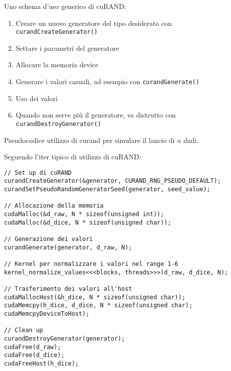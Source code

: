 \begin{questions}
\begin{solution}
        Uno schema d'uso generico di cuRAND:
        \begin{enumerate}
            \item Creare un nuovo generatore del tipo desiderato con \texttt{curandCreateGenerator()}
            
            \item Settare i parametri del generatore 
            
            \item Allocare la memoria device 
            
            \item Generare i valori casuali, ad esempio con \texttt{curandGenerate()}
            
            \item Uso dei valori 
            
            \item Quando non serve più il generatore, va distrutto con \texttt{curandDestroyGenerator()}
        \end{enumerate}
    \end{solution}
    
    \question Pseudocodice utilizzo di curand per simulare il lancio di $n$ dadi.
    
    \begin{solution}
        Seguendo l'iter tipico di utilizzo di cuRAND:
        \begin{verbatim}
// Set up di cuRAND
curandCreateGenerator(&generator, CURAND_RNG_PSEUDO_DEFAULT);
curandSetPseudoRandomGeneratorSeed(generator, seed_value);

// Allocazione della memoria
cudaMalloc(&d_raw, N * sizeof(unsigned int));
cudaMalloc(&d_dice, N * sizeof(unsigned char));

// Generazione dei valori
curandGenerate(generator, d_raw, N);

// Kernel per normalizzare i valori nel range 1-6
kernel_normalize_values<<<blocks, threads>>>(d_raw, d_dice, N);

// Trasferimento dei valori all'host
cudaMallocHost(&h_dice, N * sizeof(unsigned char));
cudaMemcpy(h_dice, d_dice, N * sizeof(unsigned char);
cudaMemcpyDeviceToHost);

// Clean up
curandDestroyGenerator(generator);
cudaFree(d_raw);
cudaFree(d_dice);
cudaFreeHost(h_dice);
        \end{verbatim}
    \end{solution}
    

\end{questions}
